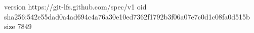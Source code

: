 version https://git-lfs.github.com/spec/v1
oid sha256:542e55dad0a4ad694c4a76a30e10ed7362f1792b3f06a07e7c0d1c08fa0d515b
size 7849
